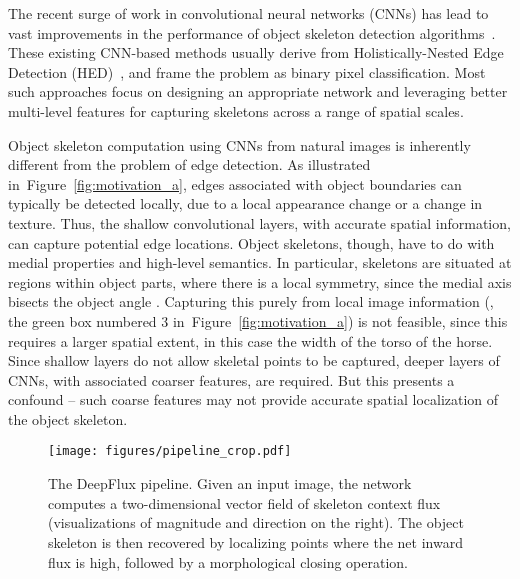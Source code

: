 \documentclass[10pt,twocolumn,letterpaper]{article}
\newcommand{\reffig}[1]{Figure~\ref{#1}}
\begin{document}
The recent surge of work in convolutional neural networks (CNNs) has lead to vast improvements in the performance of object skeleton detection algorithms~\cite{shen2016fsds,shen2017lmsds,ke2017srn,liu2017twostream,zhao2018hifi,liu2018lsn}. These existing CNN-based methods usually derive from Holistically-Nested Edge Detection (HED)~\cite{xie2015hed}, and frame the problem as binary pixel classification.
Most such approaches focus on designing an appropriate network and leveraging better multi-level features for capturing skeletons across a range of spatial scales.





Object skeleton computation using CNNs from natural images is inherently different from the problem of edge detection. As illustrated in~\reffig{fig:motivation_a}, edges associated with object boundaries can typically be detected locally, due to a local appearance change or a change in texture. Thus, the shallow convolutional layers, with accurate spatial information, can capture potential edge locations. Object skeletons, though, have to do with medial properties and high-level semantics. In particular, skeletons are situated at regions within object parts, where there is a local symmetry, since the medial axis bisects the object angle \cite{siddiqi2008}. Capturing this purely from local image information (\eg, the green box numbered 3 in~\reffig{fig:motivation_a}) is not feasible, since this requires a larger spatial extent, in this case the width of the torso of the horse. Since shallow layers do not allow skeletal points to be captured, deeper layers of CNNs, with associated coarser features, are required.
But this presents a confound -- such coarse features may not provide accurate spatial localization of the object skeleton.





\begin{figure*}
\centering
\texttt{[image: figures/pipeline\_crop.pdf]}
\vskip 0.4cm
\caption{The DeepFlux pipeline. Given an input image, the network computes a two-dimensional vector field of skeleton context flux (visualizations of magnitude and direction on the right). The object skeleton is then recovered by localizing points where the net inward flux is high, followed by a morphological closing operation.}
\label{fig:pipeline}
\end{figure*}
\end{document}
